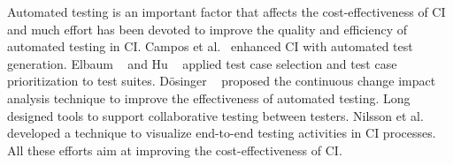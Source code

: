 

Automated testing is an important factor that affects the cost-effectiveness 
of CI and much effort has been devoted to improve the quality and 
efficiency of automated testing in CI. 
Campos et al.~\cite{campos2014continuous} 
enhanced CI with automated test generation. 
Elbaum \etal~\cite{elbaum2014techniques} and Hu 
\etal~\cite{hu2016Implementation} applied test case selection and test case 
prioritization to test suites. %
D{\"o}singer \etal~\cite{dosinger2012communicating} proposed the continuous 
change impact analysis technique 
to improve the effectiveness of automated testing. 
Long \etal~\cite{long2015collaborative} designed tools to support collaborative 
testing between testers. 
Nilsson et al.~\cite{nilsson2014visualizing} developed a technique to visualize 
end-to-end testing activities in CI processes. 
All these efforts aim at improving the cost-effectiveness of CI. 

 